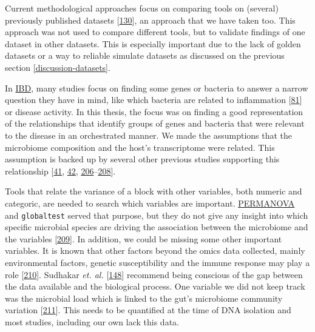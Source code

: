 \documentclass[
  12pt,
  a4paper,
  twoside,
  openright]{book}
\begin{document}
Current methodological approaches focus on comparing tools on (several) previously published datasets {[}\protect\hyperlink{ref-cantini2021}{130}{]}, an approach that we have taken too.
This approach was not used to compare different tools, but to validate findings of one dataset in other datasets.
This is especially important due to the lack of golden datasets or a way to reliable simulate datasets as discussed on the previous section \ref{discussion-datasets}.

In \protect\hyperlink{acronyms_IBD}{IBD}, many studies focus on finding some genes or bacteria to answer a narrow question they have in mind, like which bacteria are related to inflammation {[}\protect\hyperlink{ref-tang2017}{81}{]} or disease activity.
In this thesis, the focus was on finding a good representation of the relationships that identify groups of genes and bacteria that were relevant to the disease in an orchestrated manner.
We made the assumptions that the microbiome composition and the host's transcriptome were related.
This assumption is backed up by several other previous studies supporting this relationship {[}\protect\hyperlink{ref-thomas1998}{41}, \protect\hyperlink{ref-cornish2008}{42}, \protect\hyperlink{ref-holmes2012}{206}--\protect\hyperlink{ref-brand2021}{208}{]}.

Tools that relate the variance of a block with other variables, both numeric and categoric, are needed to search which variables are important.
\protect\hyperlink{acronyms_PERMANOVA}{PERMANOVA} and \texttt{globaltest} served that purpose, but they do not give any insight into which specific microbial species are driving the association between the microbiome and the variables {[}\protect\hyperlink{ref-susin2020}{209}{]}.
In addition, we could be missing some other important variables.
It is known that other factors beyond the omics data collected, mainly environmental factors, genetic susceptibility and the immune response may play a role {[}\protect\hyperlink{ref-sartor2006}{210}{]}.
Sudhakar \emph{et. al.} {[}\protect\hyperlink{ref-sudhakar2022}{148}{]} recommend being conscious of the gap between the data available and the biological process.
One variable we did not keep track was the microbial load which is linked to the gut's microbiome community variation {[}\protect\hyperlink{ref-vandeputte2017}{211}{]}.
This needs to be quantified at the time of DNA isolation and most studies, including our own lack this data.
\end{document}
